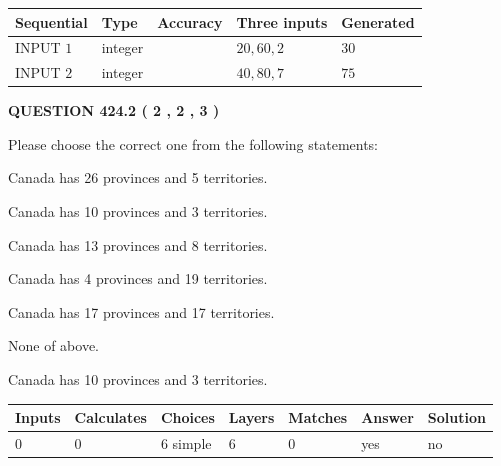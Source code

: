 \documentclass[12pt]{article}
\begin{document}
   
  
  
\noindent\begin{tabular}{|l|l|l|l|l|}
\hline
 Sequential & Type & Accuracy & Three inputs & Generated \\ 
\hline
 
 
  INPUT $  1 $ & integer &  & $
 20
 , 
 60
 , 
 2
 $ & $ 30 $ 
 \\  \hline  
 
 
  INPUT $  2 $ & integer &  & $
 40
 , 
 80
 , 
 7
 $ & $ 75 $ 
 \\  \hline  
 \end{tabular}
   
   
  
\vspace{0.2in}
  
{\textbf{\Large{QUESTION
424.2 
 ( 2 , 2 , 3 )
}}}
  
  
Please choose the correct one from the following statements:
 
 
Canada has  26 provinces and  5 territories.
 
 
Canada has 10  provinces and 3 territories.
 
 
Canada has  13 provinces and  8 territories.
 
 
Canada has   4 provinces and  19 territories.
 
 
Canada has  17 provinces and  17 territories.
 
 
 None of above.
 
 
\noindent{}
 
 
Canada has 10  provinces and 3 territories.
 
 
\noindent{}
 
 
   
   
   
   
\noindent\begin{tabular}{|l|l|l|l|l|l|l|}
 \hline
Inputs & Calculates & Choices & Layers & Matches & Answer & Solution \\ \hline
 0  & 
 0  & 
 6
  simple  
  & 
 6  & 
 0  & 
  yes & 
  no 
  \\ \hline
 \end{tabular}
   
\end{document}
